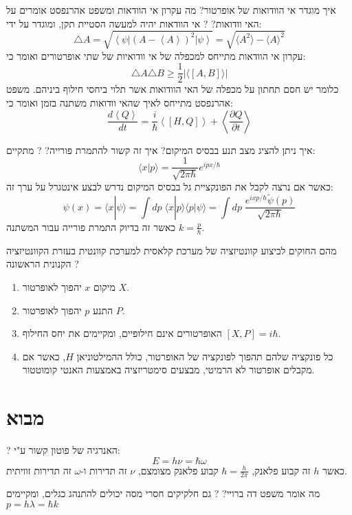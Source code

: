 \documentclass{tstextbook}
\begin{document}
איך מוגדר אי הוודואות של אופרטור? מה עקרון אי הוודאות ומשפט אהרנפסט אומרים על האי וודואות?
?
אי הוודאות יהיה למעשה הסטיית תקן, ומוגדר על ידי:
$$\triangle A = \sqrt{\left\langle\psi\right|\left(A-\left\langle A\right\rangle\right)^{2}\left|\psi\right\rangle}=\sqrt{ \langle A^{2} \rangle-\langle A \rangle ^{2}  }$$
עקרון אי הוודאות מתייחס למכפלה של אי וודואיות של שתי אופרטורים ואומר כי:
$$\triangle A \triangle B \geq \frac{1}{2}\left\lvert  \langle [A,B] \rangle   \right\rvert$$
כלומר יש חסם תחתון על מכפלה של האי הוודואות אשר תלוי ביחסי חילוף ביניהם.
משפט אהרנפסט מתייחס לאיך שהאי וודואות משתנה בזמן ואומר כי:
$$\frac{d\left<Q\right>}{d t}=\frac{i}{\hbar}\left<[H,Q]\right>+\left<\frac{\partial Q}{\partial t}\right>$$

איך ניתן להציג מצב תנע בבסיס המיקום? איך זה קשור להתמרת פורייה?
?
מתקיים:
$$\langle x|p\rangle=\frac{1}{\sqrt{2\pi\hbar}}e^{i p x/\hbar}$$
כאשר אם נרצה לקבל את הפונקציית גל בבסיס המיקום נדרש לבצע אינטגרל על ערך זה:
$$\psi(x)=\langle x|\psi\rangle=\int\!\!d p\;\langle x|p\rangle\langle p|\psi\rangle=\int\!\!d p\;{\frac{e^{i x p/\hbar}\tilde{\psi}(p)}{\sqrt{2\pi\hbar}}}$$
כאשר זה בדיוק התמרת פורייה עבור המשתנה \(k=\frac{p}{\hbar}\).

מהם החוקים לביצוע קוונטיזציה של מערכת קלאסית למערכת קוונטית בעזרת הקוונטיזציה הקנונית הראשונה
?

\begin{enumerate}
  \item מיקום \(x\) יהפוך לאופרטור \(X\). 


  \item התנע \(p\) יהפוך לאופרטור \(P\). 


  \item האופרטורים אינם חילופיים, ומקיימים את יחס החילוף \([X,P]=i\hbar\). 


  \item כל פונקציה שלהם תהפוך לפונקציה של האופרטור, כולל ההמילטוניאן \(H\), כאשר אם מקבלים אופרטור לא הרמיטי, מבצעים סימטריזציה באמצעות האנטי קומוטטור. 


\end{enumerate}
\section{מבוא}

?
האנרגיה של פוטון קשור ע"י:
$$E = h \nu = \hbar \omega$$
כאשר \(h\) זה קבוע פלאנק, \(\hbar=\frac{h}{2\pi}\) קבוע פלאנק מצומצם, \(\nu\) זה תדירות ו-\(\omega\) זה תדירות זוויתית.

מה אומר משפט דה ברויי?
?
גם חלקיקים חסרי מסה יכולים להתנהג כגלים, ומקיימים \(p=h\lambda=\hbar k\)
\end{document}
